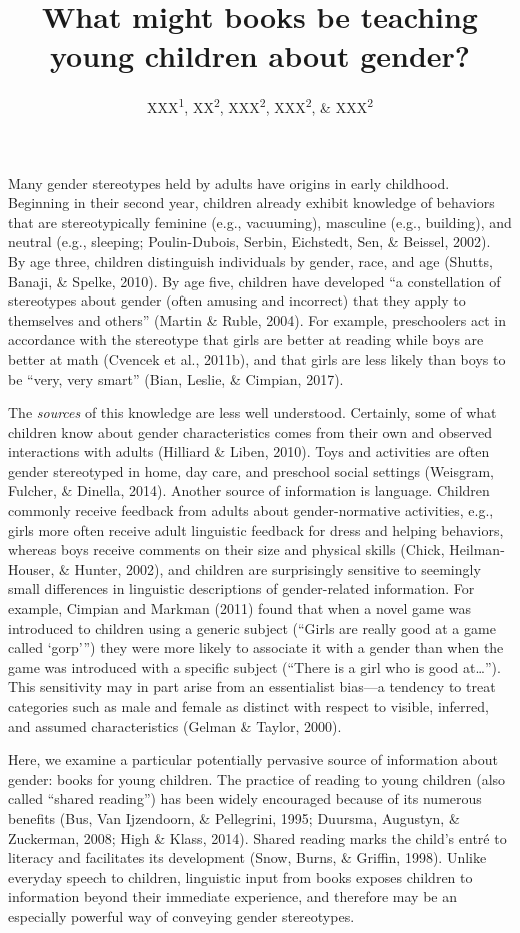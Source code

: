 \documentclass[
  english,
  ,man,floatsintext]{apa6}
\title{What might books be teaching young children about gender?}
\author{XXX\textsuperscript{1}, XX\textsuperscript{2}, XXX\textsuperscript{2}, XXX\textsuperscript{2}, \& XXX\textsuperscript{2}}
\date{}
\affiliation{\vspace{0.5cm}\textsuperscript{1} XXX\\\textsuperscript{2} XXX}
\begin{document}
\maketitle

Many gender stereotypes held by adults have origins in early childhood. Beginning in their second year, children already exhibit knowledge of behaviors that are stereotypically feminine (e.g., vacuuming), masculine (e.g., building), and neutral (e.g., sleeping; Poulin-Dubois, Serbin, Eichstedt, Sen, \& Beissel, 2002). By age three, children distinguish individuals by gender, race, and age (Shutts, Banaji, \& Spelke, 2010). By age five, children have developed \enquote{a constellation of stereotypes about gender (often amusing and incorrect) that they apply to themselves and others} (Martin \& Ruble, 2004). For example, preschoolers act in accordance with the stereotype that girls are better at reading while boys are better at math (Cvencek et al., 2011b), and that girls are less likely than boys to be \enquote{very, very smart} (Bian, Leslie, \& Cimpian, 2017).

The \emph{sources} of this knowledge are less well understood. Certainly, some of what children know about gender characteristics comes from their own and observed interactions with adults (Hilliard \& Liben, 2010). Toys and activities are often gender stereotyped in home, day care, and preschool social settings (Weisgram, Fulcher, \& Dinella, 2014). Another source of information is language. Children commonly receive feedback from adults about gender-normative activities, e.g., girls more often receive adult linguistic feedback for dress and helping behaviors, whereas boys receive comments on their size and physical skills (Chick, Heilman-Houser, \& Hunter, 2002), and children are surprisingly sensitive to seemingly small differences in linguistic descriptions of gender-related information. For example, Cimpian and Markman (2011) found that when a novel game was introduced to children using a generic subject (\enquote{Girls are really good at a game called \enquote{gorp}}) they were more likely to associate it with a gender than when the game was introduced with a specific subject (\enquote{There is a girl who is good at\ldots{}}). This sensitivity may in part arise from an essentialist bias---a tendency to treat categories such as male and female as distinct with respect to visible, inferred, and assumed characteristics (Gelman \& Taylor, 2000).

Here, we examine a particular potentially pervasive source of information about gender: books for young children. The practice of reading to young children (also called \enquote{shared reading}) has been widely encouraged because of its numerous benefits (Bus, Van Ijzendoorn, \& Pellegrini, 1995; Duursma, Augustyn, \& Zuckerman, 2008; High \& Klass, 2014). Shared reading marks the child's entré to literacy and facilitates its development (Snow, Burns, \& Griffin, 1998). Unlike everyday speech to children, linguistic input from books exposes children to information beyond their immediate experience, and therefore may be an especially powerful way of conveying gender stereotypes.
\end{document}
